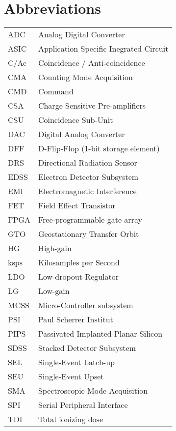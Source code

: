 \section*{Abbreviations}
\label{sec:abbreviations}

\begin{center}
\begin{tabular}{p{2cm}p{8cm}}
	ADC & Analog Digital Converter \\
	ASIC & Application Specific Inegrated Circuit \\
    C/Ac & Coincidence / Anti-coincidence \\
    CMA & Counting Mode Acquisition \\
    CMD & Command					\\
	CSA & Charge Sensitive Pre-amplifiers \\
	CSU & Coincidence Sub-Unit \\
	DAC & Digital Analog Converter \\
    DFF & D-Flip-Flop (1-bit storage element) \\
	DRS & Directional Radiation Sensor \\
	EDSS & Electron Detector Subsystem \\
	EMI & Electromagnetic Interference \\
	FET & Field Effect Transistor \\
    FPGA & Free-programmable gate array \\
	GTO & Geostationary Transfer Orbit \\
    HG & High-gain \\
    ksps & Kilosamples per Second \\
	LDO & Low-dropout Regulator \\
    LG & Low-gain \\
    MCSS & Micro-Controller subsystem \\
	PSI & Paul Scherrer Institut \\
	PIPS & Passivated Implanted Planar Silicon \\
	SDSS & Stacked Detector Subsystem \\
	SEL & Single-Event Latch-up \\
    SEU & Single-Event Upset  \\
    SMA & Spectroscopic Mode Acquisition \\
	SPI & Serial Peripheral Interface \\
    TDI & Total ionizing dose\\
\end{tabular}
\end{center}

